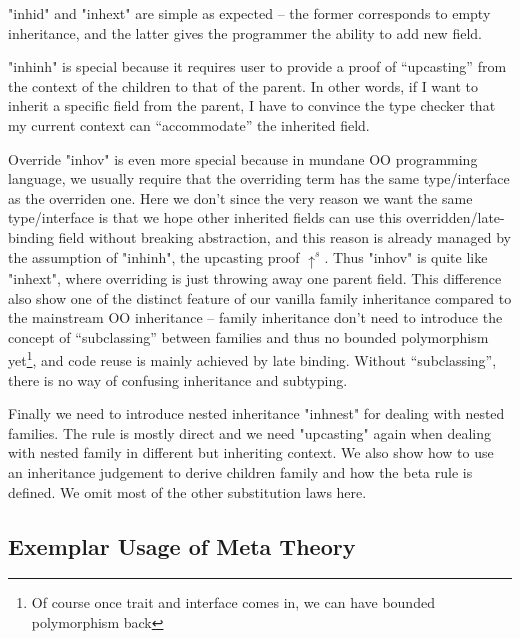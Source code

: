 "inhid" and "inhext" are simple as expected -- the former corresponds to empty inheritance, and the latter gives the programmer the ability to add new field. 

"inhinh" is special because it requires user to provide a proof of ``upcasting'' from the context of the children to that of the parent. In other words, if I want to inherit a specific field from the parent, I have to convince the type checker that my current context can ``accommodate'' the inherited field. 

Override "inhov" is even more special because in mundane OO programming language, we usually require that the overriding term has the same type/interface as the overriden one.  Here we don't since the very reason we want the same type/interface is that we hope other inherited fields can use this overridden/late-binding field without breaking abstraction, and this reason is already managed by the assumption of "inhinh", the upcasting proof $\uparrow^s$. Thus "inhov" is quite like "inhext", where overriding is just throwing away one parent field. This difference also show one of the distinct feature of our vanilla family inheritance compared to the mainstream OO inheritance -- family inheritance don't need to introduce the concept of ``subclassing'' between families and thus no bounded polymorphism yet\footnote{Of course once trait and interface comes in, we can have bounded polymorphism back}, and code reuse is mainly achieved by late binding. Without ``subclassing'', there is no way of confusing inheritance and subtyping.

Finally we need to introduce nested inheritance "inhnest" for dealing with nested families. The rule is mostly direct and we need "upcasting" again when dealing with nested family in different but inheriting context.  We also show how to use an inheritance judgement to derive children family and how the beta rule is defined. We omit most of the other substitution laws here.



\subsection{Exemplar Usage of Meta Theory}
